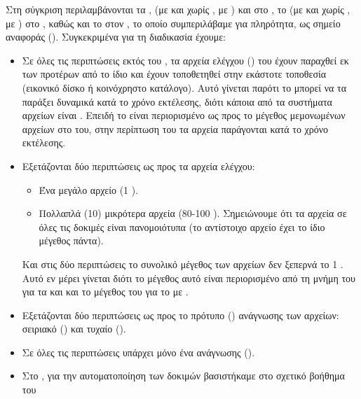 Στη σύγκριση περιλαμβάνονται τα , \viofs{} (με και χωρίς
, με ) και  στο
\osv{}, το \viofs{} (με και χωρίς , με ) στο \linux{}, καθώς και το  στον \host{}, το οποίο
συμπεριλάβαμε για πληρότητα, ως σημείο αναφοράς (). Συγκεκριμένα
για τη διαδικασία έχουμε:
\begin{itemize}
    \item Σε όλες τις περιπτώσεις εκτός του , τα αρχεία ελέγχου
          () του  έχουν παραχθεί εκ των προτέρων από το
          ίδιο και έχουν τοποθετηθεί στην εκάστοτε τοποθεσία (εικονικό δίσκο ή
          κοινόχρηστο κατάλογο). Αυτό γίνεται παρότι το  μπορεί να τα
          παράξει δυναμικά κατά το χρόνο εκτέλεσης, διότι κάποια από τα
          συστήματα αρχείων είναι . Επειδή το  είναι
          περιορισμένο ως προς το μέγεθος μεμονωμένων αρχείων στο 
          του, στην περίπτωση του τα αρχεία παράγονται κατά το χρόνο εκτέλεσης.
    \item Εξετάζονται δύο περιπτώσεις ως προς τα αρχεία ελέγχου:
          \begin{itemize}
              \item Ένα μεγάλο αρχείο (1 ).
              \item Πολλαπλά (10) μικρότερα αρχεία (80-100 ).
                    Σημειώνουμε ότι τα αρχεία σε όλες τις δοκιμές είναι
                    πανομοιότυπα (το αντίστοιχο αρχείο έχει το ίδιο μέγεθος
                    πάντα).
          \end{itemize}
          Και στις δύο περιπτώσεις το συνολικό μέγεθος των αρχείων δεν ξεπερνά
          το 1 . Αυτό εν μέρει γίνεται διότι το μέγεθος αυτό είναι
          περιορισμένο από τη μνήμη του \guest{} για τα  και 
          και το μέγεθος του  για το \viofs{} με .
    \item Εξετάζονται δύο περιπτώσεις ως προς το πρότυπο ()
          ανάγνωσης των αρχείων: σειριακό (\texttt{}) και τυχαίο
          (\texttt{}). %
    \item Σε όλες τις περιπτώσεις υπάρχει μόνο ένα  ανάγνωσης
          (\texttt{}).
    \item Στο \linux{}, για την αυτοματοποίηση των δοκιμών βασιστήκαμε στο
          σχετικό βοήθημα του %

\end{itemize}
